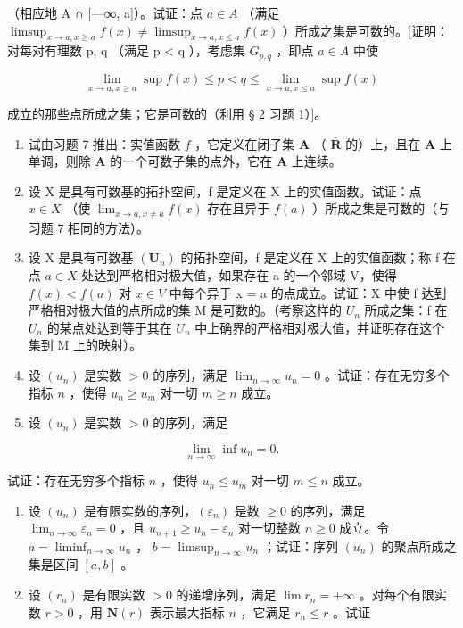 （相应地 A ∩ {[}---∞, a{]}）。试证：点 \(a \in A\) （满足 \(\limsup_{x \to a, x \geqslant a} f(x) \neq \limsup_{x \to a, x \leqslant a} f(x)\) ）所成之集是可数的。{[}证明：对每对有理数 p, q （满足 p \textless{} q ），考虑集 \(G_{p,q}\) ，即点 \(a \in A\) 中使

\[
\lim _ {x \rightarrow a, x \geqslant a} \sup f (x) \leqslant p <   q \leqslant \lim _ {x \rightarrow a, x \leqslant a} \sup f (x)
\]

成立的那些点所成之集；它是可数的（利用 § 2 习题 1）{]}。

\begin{enumerate}
\def\labelenumi{\arabic{enumi})}
\setcounter{enumi}{7}
\item
试由习题 7 推出：实值函数 \(f\) ，它定义在闭子集 \(\mathbf{A}\) （ \(\overline{\mathbf{R}}\) 的）上，且在 \(\mathbf{A}\) 上单调，则除 \(\mathbf{A}\) 的一个可数子集的点外，它在 \(\mathbf{A}\) 上连续。
\item
设 X 是具有可数基的拓扑空间，f 是定义在 X 上的实值函数。试证：点 \(x \in X\) （使 \(\lim_{x \to a, x \neq a} f(x)\) 存在且异于 \(f(a)\) ）所成之集是可数的（与习题 7 相同的方法）。
\item
设 X 是具有可数基 \((\mathbf{U}_{n})\) 的拓扑空间，f 是定义在 X 上的实值函数；称 f 在点 \(a \in X\) 处达到严格相对极大值，如果存在 a 的一个邻域 V，使得 \(f(x) < f(a)\) 对 \(x \in V\) 中每个异于 x = a 的点成立。试证：X 中使 f 达到严格相对极大值的点所成的集 M 是可数的。（考察这样的 \(U_{n}\) 所成之集：f 在 \(U_{n}\) 的某点处达到等于其在 \(U_{n}\) 中上确界的严格相对极大值，并证明存在这个集到 M 上的映射）。
\item
设 \((u_n)\) 是实数 \(>0\) 的序列，满足 \(\lim_{n\to \infty}u_n = 0\) 。试证：存在无穷多个指标 \(n\) ，使得 \(u_{n}\geqslant u_{m}\) 对一切 \(m\geqslant n\) 成立。
\item
设 \((u_n)\) 是实数 \(>0\) 的序列，满足
\end{enumerate}

\[
\lim _ {n \to \infty} \inf u _ {n} = 0.
\]

试证：存在无穷多个指标 \(n\) ，使得 \(u_{n} \leqslant u_{m}\) 对一切 \(m \leqslant n\) 成立。

\begin{enumerate}
\def\labelenumi{\arabic{enumi})}
\setcounter{enumi}{12}
\item
设 \((u_{n})\) 是有限实数的序列，\((\varepsilon_{n})\) 是数 \(\geqslant 0\) 的序列，满足 \(\lim_{n\to \infty}\varepsilon_n = 0\) ，且 \(u_{n + 1}\geqslant u_n - \varepsilon_n\) 对一切整数 \(n\geqslant 0\) 成立。令 \(a = \liminf_{n\to \infty}u_n\) ， \(b = \limsup_{n\to \infty}u_n\) ；试证：序列 \((u_{n})\) 的聚点所成之集是区间 \([a,b]\) 。
\item
设 \((r_n)\) 是有限实数 \(>0\) 的递增序列，满足 \(\lim r_n = +\infty\) 。对每个有限实数 \(r > 0\) ，用 \(\mathbf{N}(r)\) 表示最大指标 \(n\) ，它满足 \(r_n \leqslant r\) 。试证
\end{enumerate}

